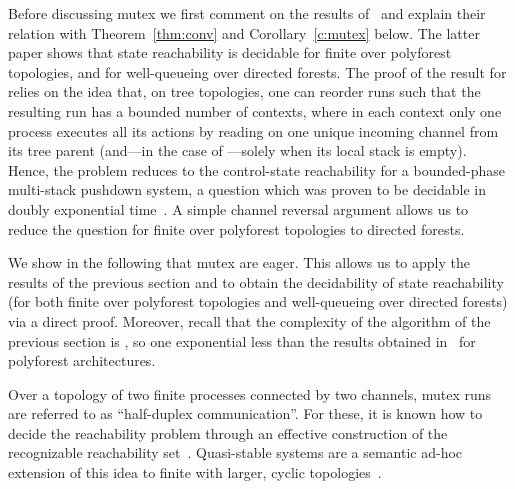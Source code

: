 \documentclass{LMCS}
\newenvironment{remark}{\begin{rem}}{\end{rem}}
\begin{document}
\smallskip

Before discussing mutex we first comment on the results
of~\cite{latorre-s-2008-299-a} and explain their relation with
Theorem~\ref{thm:conv} and Corollary~\ref{c:mutex} below.
The latter paper shows that state reachability is
decidable for finite \qcp over polyforest topologies, and for
well-queueing \rqcp over directed forests.  The proof of the result
for \rqcp relies on the idea that, on tree topologies, one can
reorder runs such that the resulting run has a bounded
number of contexts, where in each context only
one process executes all its actions by reading on one unique
incoming channel from its tree parent (and---in the case of
\rqcp---solely when its local stack is empty). Hence, the
problem reduces to the control-state reachability for a bounded-phase
multi-stack pushdown system, a question which was proven to be decidable in
doubly exponential time~\cite{latorre-s-2007-161-a}. A simple channel
reversal argument allows us to reduce the question for finite \qcp over
polyforest topologies to directed forests.

We show in the following that mutex \qcp are eager.  This
allows us to apply the results of the previous section and to obtain
the decidability of state reachability (for both finite \qcp
over polyforest topologies and well-queueing \rqcp over directed
forests)  via a direct
proof. Moreover, recall that the complexity of the algorithm of the
previous section is \dexptime, so one exponential less than the
results obtained  in~\cite{latorre-s-2007-161-a} for polyforest architectures.

\begin{remark}
  Over a topology of two finite
  processes connected by two channels, mutex runs are referred to as
  ``half-duplex communication''.
  For these, it is known how to decide the
  reachability problem through an effective construction of the
  recognizable reachability set~\cite{cece-g-2005-166-a}.
  Quasi-stable  systems are a semantic ad-hoc extension of
  this idea to finite \qcp with larger, cyclic
  topologies~\cite{cece-g-1997-304-a}.
\end{remark}
\end{document}
